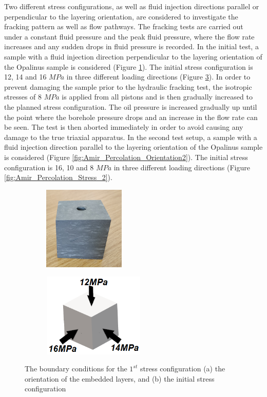 Two different stress configurations, as well as fluid injection directions parallel or perpendicular to the layering orientation, are considered to investigate the fracking pattern as well as flow pathways. The fracking tests are carried out under a constant fluid pressure and the peak fluid pressure, where the flow rate increases and any sudden drops in fluid pressure is recorded. In the initial test, a sample with a fluid injection direction perpendicular to the layering orientation of the Opalinus sample is considered (Figure \ref{fig:Amir_Percolation_Orientation1}). The initial stress configuration is 12, 14 and 16 $MPa$ in three different loading directions (Figure \ref{fig:Amir_Percolation_Stress_1}). In order to prevent damaging the sample prior to the hydraulic fracking test, the isotropic stresses of 8 $MPa$ is applied from all pistons and is then gradually increased to the planned stress configuration. The oil pressure is increased gradually up until the point where the borehole pressure drops and an increase in the flow rate can be seen. The test is then aborted immediately in order to avoid causing any damage to the true triaxial apparatus. In the second test setup, a sample with a fluid injection direction parallel to the layering orientation of the Opalinus sample is considered (Figure \ref{fig:Amir_Percolation_Orientation2}). The initial stress configuration is 16, 10 and 8 $MPa$ in three different loading directions (Figure \ref{fig:Amir_Percolation_Stress_2}).

\begin{figure}[!ht]
\begin{subfigure}[c]{0.48\textwidth}
\includegraphics[width=4cm,height=4cm]{figures/Amir_Percolation_Orientation1.png}
\subcaption{}
\label{fig:Amir_Percolation_Orientation1}
\end{subfigure}
\hfill
\begin{subfigure}[c]{0.48\textwidth}
\includegraphics[width=5cm,height=4cm]{figures/Amir_Percolation_Stress_1.png}
\subcaption{}
\label{fig:Amir_Percolation_Stress_1}
\end{subfigure}
\caption{The boundary conditions for the $1^{st}$ stress configuration (a) the orientation of the embedded layers, and (b) the initial stress configuration}
\end{figure}

